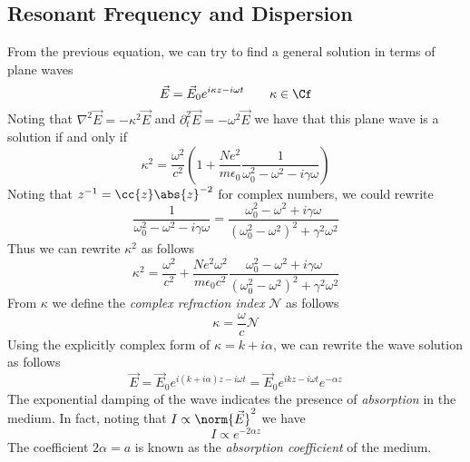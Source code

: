 \documentclass[../electromagnetism.tex]{subfiles}
\begin{document}
\subsection{Resonant Frequency and Dispersion}
From the previous equation, we can try to find a general solution in terms of plane waves
\begin{equation}
	\vec{E}=\vec{E}_0e^{i\kappa z-i\omega t}\qquad\kappa\in\Cf
	\label{eq:solution.diesol}
\end{equation}
Noting that $\nabla^2\vec{E}=-\kappa^2\vec{E}$ and $\partial^2_t\vec{E}=-\omega^2\vec{E}$ we have that this plane wave is a solution if and only if 
\begin{equation}
	\kappa^2=\frac{\omega^2}{c^2}\left( 1+\frac{Ne^2}{m\epsilon_0}\frac{1}{\omega_0^2-\omega^2-i\gamma\omega} \right)
	\label{eq:kappadef.diesol}
\end{equation}
Noting that $z^{-1}=\cc{z}\abs{z}^{-2}$ for complex numbers, we could rewrite
\begin{equation*}
	\frac{1}{\omega_0^2-\omega^2-i\gamma\omega}=\frac{\omega_0^2-\omega^2+i\gamma\omega}{\left( \omega_0^2-\omega^2 \right)^2+\gamma^2\omega^2}
\end{equation*}
Thus we can rewrite $\kappa^2$ as follows
\begin{equation}
	\kappa^2=\frac{\omega^2}{c^2}+\frac{Ne^2\omega^2}{m\epsilon_0c^2}\frac{\omega_0^2-\omega^2+i\gamma\omega}{\left( \omega_0^2-\omega^2 \right)^2+\gamma^2\omega^2}
	\label{eq:kappadef2.diesol}
\end{equation}
From $\kappa$ we define the \textit{complex refraction index} $\mathcal{N}$ as follows
\begin{equation}
	\kappa=\frac{\omega}{c}\mathcal{N}
	\label{eq:complexrefind.diesol}
\end{equation}
Using the explicitly complex form of $\kappa=k+i\alpha$, we can rewrite the wave solution as follows
\begin{equation}
	\vec{E}=\vec{E}_0e^{i\left( k+i\alpha \right)z-i\omega t}=\vec{E}_0e^{ikz-i\omega t}e^{-\alpha z}
	\label{eq:diesol1.diesol}
\end{equation}
The exponential damping of the wave indicates the presence of \textit{absorption} in the medium. In fact, noting that $I\propto\norm{\vec{E}}^2$ we have
\begin{equation*}
	I\propto e^{-2\alpha z}
\end{equation*}
The coefficient $2\alpha=a$ is known as the \textit{absorption coefficient} of the medium.\\
\end{document}
